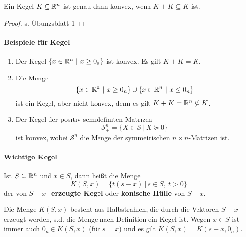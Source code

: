 \begin{Lemma}
	Ein Kegel $K\subseteq \mathbb R^n$ ist genau dann konvex, wenn $K+K\subseteq K$ ist.
\end{Lemma}
\begin{proof}
	s. Übungsblatt 1
\end{proof}

\paragraph{Beispiele f\"ur Kegel}

\begin{enumerate}[label=\emph{\alph*})]
	\item Der Kegel $\lbrace x\in\mathbb R^n ~\vert~ x \geq 0_n \rbrace$ ist konvex. Es gilt $K+K=K$.
	\item Die Menge
	\begin{equation*}
		\lbrace x\in\mathbb R^n~\vert~x\geq 0_n \rbrace\cup\lbrace x\in\mathbb R^n~\vert~x\leq 0_n \rbrace
	\end{equation*}
	ist ein Kegel, aber nicht konvex, denn es gilt $K+K= \mathbb R^n\not\subseteq K$.
	\item Der Kegel der positiv semidefiniten Matrizen
	\begin{equation*}
		\mathcal{S}^n_+=\lbrace X\in\mathcal{S} ~\vert~ X\succcurlyeq 0\rbrace
	\end{equation*}
	ist konvex, wobei $\mathcal{S}^n$ die Menge der symmetrischen $n \times n$-Matrizen ist.
\end{enumerate}

\paragraph{Wichtige Kegel}

\begin{Definition}
 Ist $S\subseteq \mathbb R^n$ und $x\in S$, dann hei\ss t die Menge
 \begin{equation*}
 	K(S,x)=\lbrace t(s-x) ~\vert~ s\in S, ~t>0  \rbrace
 \end{equation*}
 der von $S-x$ ~\textbf{erzeugte Kegel} oder \textbf{konische H\"ulle} von $S-x$.
\end{Definition}
Die Menge $K(S,x)$ besteht aus Halbstrahlen, die durch die Vektoren $S-x$ erzeugt werden, s.d. die Menge nach Definition ein Kegel ist. Wegen $x\in S$ ist immer  auch $0_n\in K(S,x)$ (f\"ur $s=x$) und es gilt $K(S,x)=K(s-x,0_n)$.

